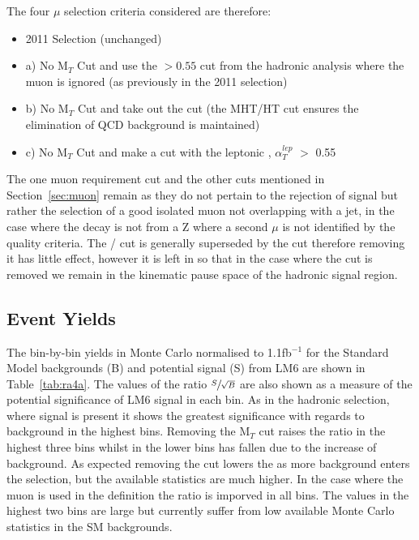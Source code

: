 The four $\mu$ selection criteria considered are therefore:

\begin{itemize}
\item 2011 Selection (unchanged)
\item a) No M$_{T}$ Cut and use the \alt $> 0.55$ cut from the hadronic analysis where the muon is ignored (as previously in the 2011 selection)
\item b) No M$_{T}$ Cut and take out the \alt cut (the MHT/HT cut ensures the elimination of QCD background is maintained)
\item c) No M$_{T}$ Cut and make a cut with the leptonic \alt, $\alpha^{lep}_{T}$ $>$ 0.55
\end{itemize}

The one muon requirement cut and the other cuts mentioned in Section~\ref{sec:muon} remain as they do not pertain to the rejection of signal but rather the selection of a good isolated muon not overlapping with a jet, in the case where the decay is not from a Z where a second $\mu$ is not identified by the quality criteria. The \MHT / \HT cut is generally superseded by the \alt cut therefore removing it has little effect, however it is left in so that in the case where the \alt cut is removed we remain in the kinematic pause space of the hadronic signal region. 

\subsection{Event Yields}

The bin-by-bin yields in Monte Carlo normalised to 1.1fb$^{-1}$ for the Standard Model backgrounds (B) and potential signal (S) from LM6 are shown in Table~\ref{tab:ra4a}. The values of the ratio $\sfrac{S}{\sqrt{B}}$ are also shown as a measure of the potential significance of LM6 signal in each bin. As in the hadronic selection, where signal is present it shows the greatest significance with regards to background in the highest \HT bins. Removing the M$_{T}$ cut raises the ratio \srb in the highest three bins whilst in the lower bins \srb has fallen due to the increase of background. As expected removing the \alt cut lowers the \srb as more background enters the selection, but the available statistics are much higher. In the case where the muon is used in the \alt definition the ratio is imporved in all bins. The values in the highest two bins are large but currently suffer from low available Monte Carlo statistics in the SM backgrounds. 

